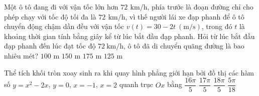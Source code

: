 \begin{ex}%
Một ô tô đang đi với vận tốc lớn hơn $72~\mathrm{\,km}/\mathrm{h}$, phía trước là đoạn đường chỉ cho phép chạy với tốc độ tối đa là $72~\mathrm{\,km}/\mathrm{h}$, vì thế người lái xe đạp phanh để ô tô chuyển động chậm dần đều với vận tốc $v(t)=30-2t~(\mathrm{m}/\mathrm{s})$, trong đó $t$ là khoảng thời gian tính bằng giây kể từ lúc bắt đầu đạp phanh. Hỏi từ lúc bắt đầu đạp phanh đến lúc đạt tốc độ $72~\mathrm{km}/\mathrm{h}$, ô tô đã di chuyển quãng đường là bao nhiêu mét?
\choice
{$100$ m}
{$150$ m}
{$175$ m}
{\True $125$ m}
\end{ex}

\begin{ex}%
Thể tích khối tròn xoay sinh ra khi quay hình phẳng giới hạn bởi đồ thị các hàm số $y=x^2-2x$, $y=0$, $x=-1$, $x=2$ quanh trục $Ox$ bằng
\choice
{$\dfrac{16\pi}{5}$}
{$\dfrac{17\pi}{5}$}
{\True $\dfrac{18\pi}{5}$}
{$\dfrac{5\pi}{18}$}
\end{ex}

